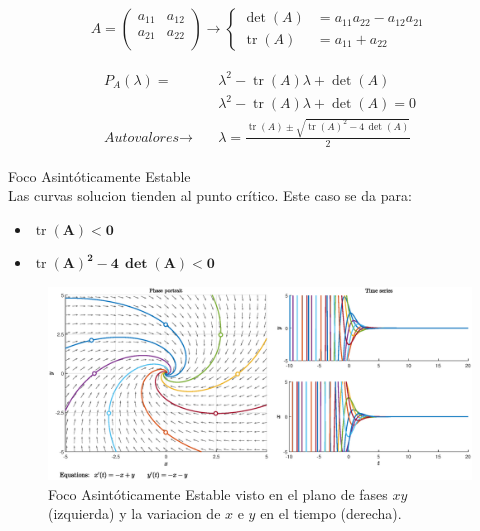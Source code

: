 \documentclass[12pt,a4paper]{report} %
\newcommand{\tr}{\operatorname{\textrm{tr}}}
\begin{document}
	\begin{equation}
		\label{eq:equilibrio}
		A=\begin{pmatrix}
			a_{11} & a_{12}\\
			a_{21} & a_{22}\\
		\end{pmatrix}\rightarrow\left\{
		\begin{aligned}
		\det(A )&= a_{11}a_{22}-a_{12}a_{21} \\
		\tr(A) &= a_{11}+a_{22}
	    \end{aligned}
		\right.
	\end{equation}\smallskip
	
	\begin{eqnarray}
		\begin{aligned}
		P_A(\lambda)=&\lambda^2-\tr(A)\lambda+\det(A) \nonumber \\[1mm]
		&\lambda^2-\tr(A)\lambda+\det(A)=0 \nonumber \\[1mm]
		\textit{Autovalores}\rightarrow \quad &\lambda=\frac{\tr(A)\pm \sqrt{\tr(A)^2-4\,\det(A)}}{2}
	    \end{aligned}
	\end{eqnarray}
	
	\newpage

	{\Large\textbullet\quad Foco Asintóticamente Estable}\\[0.5cm]
	
	Las curvas solucion tienden al punto crítico. Este caso se da para: 
	\begin{itemize}
		\item \textbf{$\tr$}$\bm{(A)<0}$
		\item \textbf{$\tr$}$\bm{(A)^2-4\, \det(A)<0}$
	\end{itemize}
	
	\begin{figure}[h]
		\centering
		\includegraphics[width=1\textwidth]{estable.eps}
		\caption{Foco Asintóticamente Estable visto en el plano de fases $xy$ (izquierda) y la variacion de $x$ e $y$ en el tiempo (derecha).}
		\label{fig:estable}
	\end{figure}\smallskip
	
\end{document}
